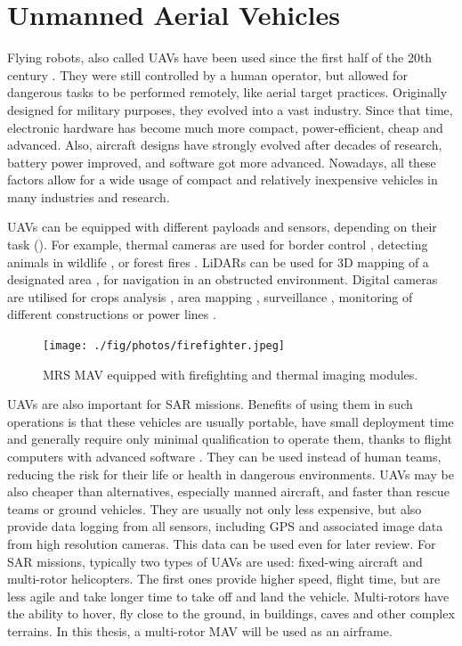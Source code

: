 \section{Unmanned Aerial Vehicles}
Flying robots, also called \acs{UAV}s have been used since the first half of the 20th century \cite{keane2013brief}. They were still controlled by a human operator, but allowed for dangerous tasks to be performed remotely, like aerial target practices. Originally designed for military purposes, they evolved into a vast industry. Since that time, electronic hardware has become much more compact, power-efficient, cheap and advanced. Also, aircraft designs have strongly evolved after decades of research, battery power improved, and software got more advanced. Nowadays, all these factors allow for a wide usage of compact and relatively inexpensive vehicles in many industries and research. 

\acs{UAV}s can be equipped with different payloads and sensors, depending on their task (). For example, thermal cameras are used for border control \cite{abushahma2019comparative, pedrozo2017swiss, girard2004border}, detecting animals in wildlife \cite{chretien2015wildlife, lhoest2015many}, or forest fires \cite{yuan2017fire, merino2005cooperative}. \acs{LiDAR}s can be used for 3D mapping of a designated area \cite{lin2019evaluation}, for navigation in an obstructed environment. Digital cameras are utilised for crops analysis \cite{paredes2017multispectral, yue2018comparison}, area mapping \cite{nex2014uav}, surveillance \cite{girard2004border}, monitoring of different constructions or power lines \cite{zhang2017uav}. 


\begin{figure}[!h]
  \centering
  \texttt{[image: ./fig/photos/firefighter.jpeg]}

  \caption{\acs{MRS} \acs{MAV} equipped with firefighting and thermal imaging modules.}
  \label{fig:firefighter}
\end{figure}


\acs{UAV}s are also important for \ac{SAR} missions. Benefits of using them in such operations is that these vehicles are usually portable, have small deployment time and generally require only minimal qualification to operate them, thanks to flight computers with advanced software \cite{erdos2013experimental, goodrich2008supporting}. They can be used instead of human teams, reducing the risk for their life or health in dangerous environments. \acs{UAV}s may be also cheaper than alternatives, especially manned aircraft, and faster than rescue teams or ground vehicles. They are usually not only less expensive, but also provide data logging from all sensors, including \acs{GPS} and associated image data from high resolution cameras. This data can be used even for later review. For \acs{SAR} missions, typically two types of \acs{UAV}s are used: fixed-wing aircraft and multi-rotor helicopters. The first ones provide higher speed, flight time, but are less agile and take longer time to take off and land the vehicle. Multi-rotors have the ability to hover, fly close to the ground, in buildings, caves and other complex terrains. In this thesis, a multi-rotor \acs{MAV} will be used as an airframe. 


